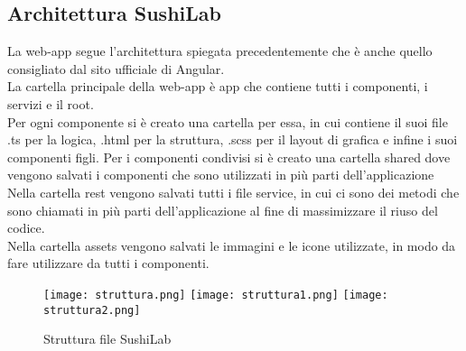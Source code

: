 \subsection{Architettura SushiLab}
La web-app segue l'architettura spiegata precedentemente che è anche quello consigliato dal sito ufficiale di Angular.\\
La cartella principale della web-app è app che contiene tutti i componenti, i servizi e il root.\\ 
Per ogni componente si è creato una cartella per essa, in cui contiene il suoi file .ts per la logica, .html per la struttura, .scss per il layout di grafica e infine i suoi componenti figli. Per i componenti condivisi si è creato una cartella shared dove vengono salvati i componenti che sono utilizzati in più parti dell'applicazione\\
Nella cartella rest vengono salvati tutti i file service, in cui ci sono dei metodi che sono chiamati in più parti dell'applicazione al fine di massimizzare il riuso del codice.\\
Nella cartella assets vengono salvati le immagini e le icone utilizzate, in modo da fare utilizzare da tutti i componenti.\\
\begin{figure}[H]
    \centering
    \texttt{[image: struttura.png]}
    \texttt{[image: struttura1.png]}
    \texttt{[image: struttura2.png]}
    \caption{Struttura file SushiLab}
\end{figure}
